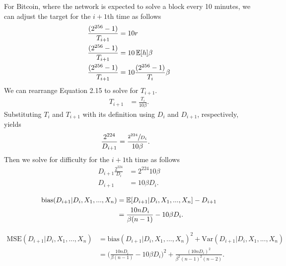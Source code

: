 For Bitcoin, where the network is expected to solve a block every 10 minutes, we can adjust the target for the $i+1$th time as follows 
\begin{align}
\frac{(2^{256}-1)}{T_{i+1}} &= 10r \\
\frac{(2^{256}-1)}{T_{i+1}} &= 10\operatorname{\mathbb{E}}[h] \beta \\
\frac{(2^{256}-1)}{T_{i+1}} &= 10\frac{(2^{256}-1)}{T_i}\beta 
\end{align}
We can rearrange Equation 2.15 to solve for $T_{i+1}$.
\begin{align}
T_{i+1} &= \frac{T_i}{10\beta}.
\end{align}
Substituting $T_i$ and $T_{i+1}$ with its definition using $D_i$ and $D_{i+1}$, respectively, yields
\begin{align}
\frac{2^{224}}{D_{i+1}} &= \frac{\sfrac{2^{224}}{D_i}}{10\beta}.
\end{align}
Then we solve for difficulty for the $i+1$th time as follows 
\begin{align}
D_{i+1}\frac{2^{224}}{D_i} &= 2^{224}10\beta \\
D_{i+1} &= 10\beta D_i.
\end{align}

\begin{align}
\text{bias}(D_{i+1}|D_i,X_1,...,X_n) &= \operatorname{\mathbb{E}}[D_{i+1}|D_i,X_1,...,X_n] - D_{i+1} \\
&= \frac{10n D_i}{\beta(n-1)} - 10\beta D_i.
\end{align}

\begin{align}
\text{MSE}(D_{i+1}|D_i,X_1,...,X_n) &= \text{bias}(D_{i+1}|D_i,X_1,...,X_n)^2 + \text{Var}(D_{i+1}|D_i,X_1,...,X_n) \\
&= \Bigg(\frac{10n D_i}{\beta(n-1)} - 10\beta D_i\Bigg)^2 + \frac{(10n D_i)^2}{\beta^2(n-1)^2(n-2)}.
\end{align}

